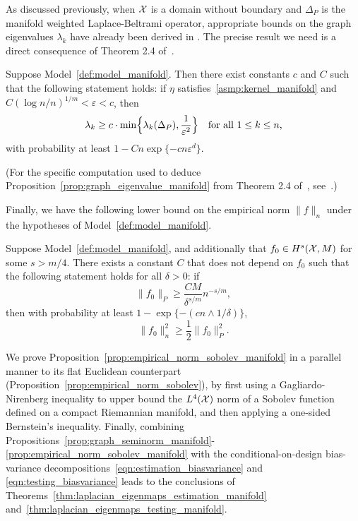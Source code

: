 As discussed previously, when $\mathcal{X}$ is a domain without boundary and $\Delta_P$ is the manifold weighted Laplace-Beltrami operator, appropriate bounds on the graph eigenvalues $\lambda_k$ have already been derived in \citep{burago2014,trillos2019,garciatrillos19}. The precise result we need is a direct consequence of Theorem 2.4 of~\citep{calder2019}.
\begin{proposition}
	\label{prop:graph_eigenvalue_manifold}
	Suppose Model~\ref{def:model_manifold}. Then there exist constants $c$ and $C$ such that the following statement holds: if $\eta$ satisfies~\ref{asmp:kernel_manifold} and $C(\log n/n)^{1/m} < \varepsilon < c$, then
	\begin{equation}
	\label{eqn:graph_eigenvalue_manifold}
	\lambda_k \geq c \cdot \min\Bigl\{\lambda_k(\Delta_P), \frac{1}{\varepsilon^{2}} \Bigr\} \quad \textrm{for all $1 \leq k \leq n$,}
	\end{equation}
	with probability at least $1 - Cn\exp\{-c n\varepsilon^d\}$. 
\end{proposition}
(For the specific computation used to deduce Proposition~\ref{prop:graph_eigenvalue_manifold} from Theorem 2.4 of~\citep{calder2019}, see~\cite{green2021}.)

Finally, we have the following lower bound on the empirical norm $\|f\|_n$ under the hypotheses of Model~\ref{def:model_manifold}. 
\begin{proposition}
	\label{prop:empirical_norm_sobolev_manifold}
	Suppose Model~\ref{def:model_manifold}, and additionally that $f_0 \in H^s(\mathcal{X},M)$ for some $s > m/4$. There exists a constant $C$ that does not depend on $f_0$ such that the following statement holds for all $\delta > 0$:  if
	\begin{equation}
	\label{eqn:empirical_norm_sobolev_manifold_1}
	\|f_0\|_{P} \geq \frac{C M}{\delta^{s/m}}n^{-s/m},
	\end{equation}
	then with probability at least $1 - \exp\{-(cn \wedge 1/\delta)\}$,
	\begin{equation}
	\label{eqn:empirical_norm_sobolev_manifold}
	\|f_0\|_n^2 \geq \frac{1}{2} \|f_0\|_P^2.
	\end{equation}
\end{proposition}
We prove Proposition~\ref{prop:empirical_norm_sobolev_manifold} in a parallel manner to its flat Euclidean counterpart (Proposition~\ref{prop:empirical_norm_sobolev}), by first using a Gagliardo-Nirenberg inequality to upper bound the $L^4(\mathcal{X})$ norm of a Sobolev function defined on a compact Riemannian manifold, and then applying a one-sided Bernstein's inequality. Finally, combining Propositions~\ref{prop:graph_seminorm_manifold}-\ref{prop:empirical_norm_sobolev_manifold} with the conditional-on-design bias-variance decompositions~\eqref{eqn:estimation_biasvariance} and \eqref{eqn:testing_biasvariance} leads to the conclusions of Theorems~\ref{thm:laplacian_eigenmaps_estimation_manifold} and~\ref{thm:laplacian_eigenmaps_testing_manifold}. 

